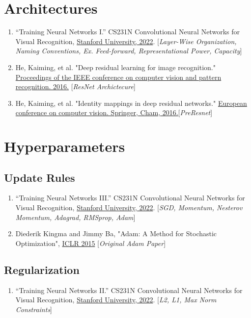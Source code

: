 \documentclass[12pt]{article}
\begin{document}
\section{Architectures}
\begin{enumerate}
    \item “Training Neural Networks I.” 
    CS231N Convolutional Neural Networks for Visual Recognition, 
    \href{https://cs231n.github.io/neural-networks-1/#nn}{Stanford University, 2022}.
    [\emph{Layer-Wise Organization, Naming Conventions, Ex. Feed-forward, 
    Representational Power, Capacity}]
    \item He, Kaiming, et al. "Deep residual learning for image recognition." 
    \href{https://arxiv.org/abs/1512.03385}{Proceedings of the IEEE conference 
    on computer vision and pattern recognition. 2016.} [\emph{ResNet Archictecure}]
    \item He, Kaiming, et al. "Identity mappings in deep residual networks." 
    \href{https://arxiv.org/abs/1603.05027}{European conference on computer vision. 
    Springer, Cham, 2016.}[\emph{PreResnet}]
\end{enumerate}

\section{Hyperparameters}
\subsection{Update Rules}
\begin{enumerate}
    \item “Training Neural Networks III.” 
    CS231N Convolutional Neural Networks for Visual Recognition, 
    \href{https://cs231n.github.io/neural-networks-3/#update}{Stanford University, 2022}. 
    [\emph{SGD, Momentum, Nesterov Momentum, Adagrad, RMSprop, Adam}]

    \item Diederik Kingma and Jimmy Ba, 
    "Adam: A Method for Stochastic Optimization", 
    \href{https://arxiv.org/abs/1412.6980}{ICLR 2015}
    [\emph{Original Adam Paper}]
\end{enumerate}

\subsection{Regularization}
\begin{enumerate}
    \item “Training Neural Networks II.” 
    CS231N Convolutional Neural Networks for Visual Recognition, 
    \href{https://cs231n.github.io/neural-networks-2/#reg}{Stanford University, 2022}. 
    [\emph{L2, L1, Max Norm Constraints}]
\end{enumerate}
\end{document}
